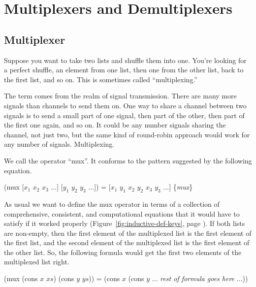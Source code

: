 \chapter{Multiplexers and Demultiplexers}
\label{ch:mux-dmx}

\section{Multiplexer}
\label{sec:mux}

Suppose you want to take two lists and shuffle them into one.
You're looking for a perfect shuffle, 
an element from one list,
then one from the other list, back to the first list, and so on.
This is sometimes called ``multiplexing.''

The term comes from the realm of signal transmission.
There are many more signals than channels to send them on.
One way to share a channel between two signals is to
send a small part of one signal, then part of the other,
then part of the first one again, and so on.
It could be any number signals sharing the channel, not just two,
but the same kind of round-robin approach would work for any
number of signals.
Multiplexing.

We call the operator 
``mux''.
It conforms to the pattern suggested by the following equation.

\hspace{1cm} (mux [$x_1$ $x_2$ $x_3$ $\dots$] [$y_1$ $y_2$ $y_3$ $\dots$]) =
     [$x_1$ $y_1$ $x_2$ $y_2$ $x_3$ $y_3$ $\dots$] \hfill \{\emph{mux}\}

As usual we want to define the mux operator in terms of
a collection of comprehensive, consistent, and computational equations
that it would have to satisfy if it worked properly
(Figure~\ref{fig:inductive-def-keys}, page \pageref{fig:inductive-def-keys}).
If both lists are non-empty,
then the first element of the multiplexed list is the first element of the first list,
and the second element of the multiplexed list is the first element of the other list.
So, the following formula would
get the first two elements of the multiplexed list right.

\hspace{1cm} (mux (cons $x$ $xs$) (cons $y$ $ys$)) =
(cons $x$ (cons $y$ $\dots$ \emph{rest of formula goes here} $\dots$))

